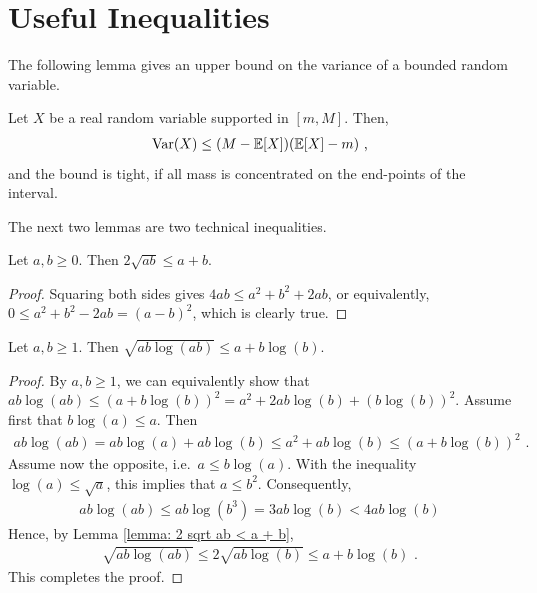 \section{Useful Inequalities}\label{app: useful inequalities}
The following lemma gives an upper bound on the variance of a bounded random variable.
\begin{lemma}\label{lemma: bhatia-davis}
	Let $X$ be a real random variable supported in $[m,M]$. Then, 
	\begin{align*}
	\operatorname*{Var}(X) \leq (M-\mathbb{E}[X])(\mathbb{E}[X] - m) \text{ ,}
	\end{align*}
	and the bound is tight, if all mass is concentrated on the end-points of the interval.
\end{lemma}

\noindent
The next two lemmas are two technical inequalities.
\begin{lemma}\label{lemma: 2 sqrt ab < a + b}
	Let $a,b \geq 0$. Then $2\sqrt{ab} \leq a + b$.
\end{lemma}
\begin{proof}
	Squaring both sides gives $4 ab \leq a^2 + b^2 + 2 ab$, or equivalently, $0 \leq a^2 + b^2 - 2ab = (a-b)^2$, which is clearly true.
\end{proof}

\begin{lemma}\label{lemma: sqrt ab ln(ab) < a + b ln(b)}
	Let $a,b \geq 1$. Then $\sqrt{ab \log(ab)} \leq a + b \log(b)$.
\end{lemma}
\begin{proof}
By $a,b \geq 1$, we can equivalently show that $ab \log(ab) \leq (a + b\log(b))^2 =  a^2 + 2ab\log(b) + (b \log(b))^2$. Assume first that $b \log(a) \leq a$. Then 
\begin{align*}
	ab \log(ab) = ab \log(a) + ab \log(b) \leq a^2 + ab \log(b) \leq (a + b\log(b))^2 \text{ .}
\end{align*}
Assume now the opposite, i.e.\ $a \leq b \log(a)$. With the inequality $\log(a) \leq \sqrt{a}$, this implies that $a \leq b^2$. Consequently,
\begin{align*}
	ab \log(ab) \leq ab \log(b^3) = 3 ab \log(b) < 4 ab \log(b)
\end{align*}
Hence, by Lemma \ref{lemma: 2 sqrt ab < a + b},
\begin{align*}
	\sqrt{ab \log(ab)} \leq 2 \sqrt{ ab \log(b)} \leq a + b\log(b) \text{ .}
\end{align*}
This completes the proof.
\end{proof}


